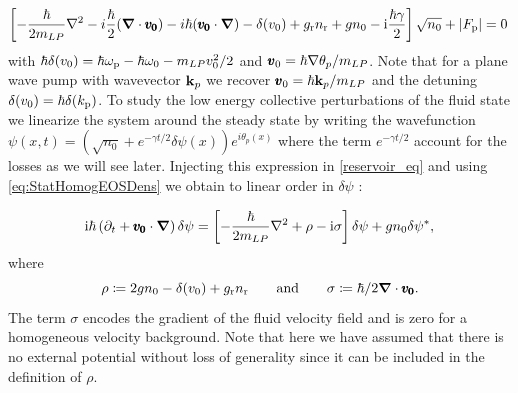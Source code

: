 \begin{equation}
    \left[-\frac{\hbar}{2m_{LP}}\nabla^2-i\frac{\hbar}{2}(\boldsymbol{\nabla}\cdot\pmb{v_0}) -i\hbar(\pmb{v_0}\cdot\boldsymbol{\nabla})- \delta(v_0)+g_{\rm r}n_{\rm r}+g n_0-\mathrm{i}\frac{\hbar\gamma}{2}\right]\sqrt{n_0}+|F_{\mathrm{p}}|=0\,
        \label{eq:StatHomogEOSDens}
\end{equation}
with $\hbar \delta(v_0)=\hbar\omega_{\mathrm{p}}-\hbar\omega_0-m_{LP} v_0^2/2$ and $\pmb{v}_0=\hbar \nabla \theta_p/m_{LP}$. Note that for a plane wave pump with wavevector $\mathbf{k}_p$ we recover $\pmb{v}_0=\hbar \mathbf{k}_p/m_{LP}$ and the detuning $\delta(v_0)=\hbar \delta(k_{\mathrm{p}})$.
To study the low energy collective perturbations of the fluid state we linearize the system around the steady state by writing the wavefunction
$\psi(x,t)=(\sqrt{n_0}+e^{-\gamma t/2}\delta\psi(x))e^{i\theta_p(x)}$ where the term $e^{-\gamma t/2}$ account for the losses as we will see later. Injecting this expression in \autoref{reservoir_eq} and using \autoref{eq:StatHomogEOSDens} we obtain to linear order in $\delta\psi$ :

\begin{equation}
    \mathrm{i} \hbar \left(\partial_t+\pmb{v_0}\cdot{\boldsymbol{\nabla}}\right)\delta\psi=\left[-\frac{\hbar}{2m_{LP}}\nabla^2+\rho-\mathrm{i}\sigma\right]\delta \psi+g n_0 \delta\psi^*,
        \label{eq:DefPertGPE}
\end{equation}
where $$\rho\coloneqq2g n_0- \delta(v_0)+g_{\rm r}n_{\rm r}\qquad\text{and}\qquad\sigma\coloneqq\hbar/2\boldsymbol{\nabla} \cdot\pmb{v_0}.$$
The term $\sigma$ encodes the gradient of the fluid velocity field and is zero for a homogeneous velocity background. 
Note that here we have assumed that there is no external potential without loss of generality since it can be included in the definition of $\rho$.

\bigskip

